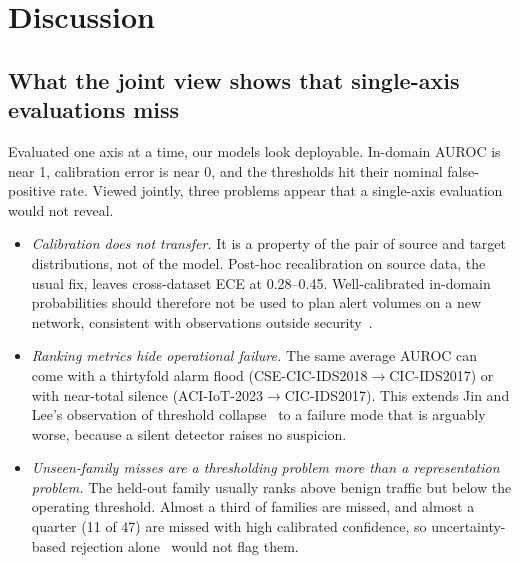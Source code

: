 \section{Discussion}\label{sec:discussion}

\subsection{What the joint view shows that single-axis evaluations miss}
Evaluated one axis at a time, our models look deployable. In-domain AUROC is near 1, calibration error is near 0, and the thresholds hit their nominal false-positive rate. Viewed jointly, three problems appear that a single-axis evaluation would not reveal.
\begin{itemize}
\item \emph{Calibration does not transfer.} It is a property of the pair of source and target distributions, not of the model. Post-hoc recalibration on source data, the usual fix, leaves cross-dataset ECE at 0.28--0.45. Well-calibrated in-domain probabilities should therefore not be used to plan alert volumes on a new network, consistent with observations outside security~\cite{ovadia2019trust}.
\item \emph{Ranking metrics hide operational failure.} The same average AUROC can come with a thirtyfold alarm flood (CSE-CIC-IDS2018$\to$CIC-IDS2017) or with near-total silence (ACI-IoT-2023$\to$CIC-IDS2017). This extends Jin and Lee's observation of threshold collapse~\cite{jin2026benchmark} to a failure mode that is arguably worse, because a silent detector raises no suspicion.
\item \emph{Unseen-family misses are a thresholding problem more than a representation problem.} The held-out family usually ranks above benign traffic but below the operating threshold. Almost a third of families are missed, and almost a quarter (11 of 47) are missed with high calibrated confidence, so uncertainty-based rejection alone~\cite{talpini2024enhancing} would not flag them.
\end{itemize}

